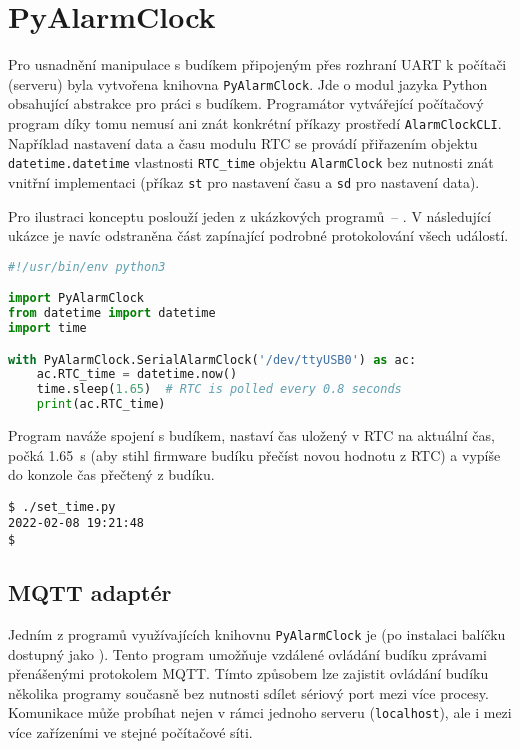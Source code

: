 \section{PyAlarmClock}
\label{sec:PyAlarmClock}
Pro usnadnění manipulace s budíkem připojeným přes rozhraní UART k počítači
(serveru) byla vytvořena knihovna \texttt{PyAlarmClock}. Jde o modul jazyka
Python obsahující abstrakce pro práci s budíkem. Programátor vytvářející
počítačový program díky tomu nemusí ani znát konkrétní příkazy prostředí
\texttt{AlarmClockCLI}. Například nastavení data a času modulu \acs{RTC} se
provádí přiřazením objektu \texttt{datetime.datetime} vlastnosti
\verb|RTC_time| objektu \texttt{AlarmClock} bez nutnosti znát vnitřní
implementaci (příkaz \texttt{st} pro nastavení času a \texttt{sd} pro nastavení
data).

Pro ilustraci konceptu poslouží jeden z ukázkových programů~--
. V následující ukázce je navíc
odstraněna část zapínající podrobné protokolování všech událostí.
\begin{lstlisting}[language=Python,style=numbers]
#!/usr/bin/env python3

import PyAlarmClock
from datetime import datetime
import time

with PyAlarmClock.SerialAlarmClock('/dev/ttyUSB0') as ac:
    ac.RTC_time = datetime.now()
    time.sleep(1.65)  # RTC is polled every 0.8 seconds
    print(ac.RTC_time)
\end{lstlisting}
Program naváže spojení s budíkem, nastaví čas uložený v RTC na aktuální čas,
počká \SI{1,65}{\second} (aby stihl firmware budíku přečíst novou hodnotu
z RTC) a vypíše do konzole čas přečtený z budíku.
\begin{lstlisting}[style=terminal]
$ ./set_time.py
2022-02-08 19:21:48
$
\end{lstlisting}


\subsection{MQTT adaptér}
Jedním z programů využívajících knihovnu \texttt{PyAlarmClock} je
 (po instalaci balíčku
dostupný jako ). Tento program umožňuje vzdálené ovládání
budíku zprávami přenášenými protokolem MQTT. Tímto způsobem lze zajistit
ovládání budíku několika programy současně bez nutnosti sdílet sériový port
mezi více procesy. Komunikace může probíhat nejen v rámci jednoho serveru
(\texttt{localhost}), ale i mezi více zařízeními ve stejné počítačové síti.

